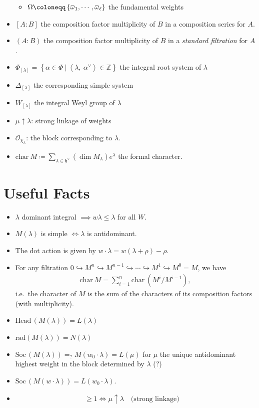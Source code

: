 \documentclass[11pt]{scrartcl}
\theoremstyle{definition}
\theoremstyle{theorem}
\theoremstyle{proof}
\theoremstyle{definition}
\theoremstyle{break}
\theoremstyle{problem}
\providecommand{\tightlist}{%
  \setlength{\itemsep}{0pt}\setlength{\parskip}{0pt}}
\DeclarePairedDelimiter\qty{(}{)}
\renewcommand{\qty}[1]{{\left(  {#1} \right)}}
\newcommand{\ZZ}[0]{{\mathbb{Z}}}
\newcommand{\ch}[0]{\mathrm{char}~}
\newcommand{\qtext}[1]{{\quad \text{#1} \quad}}
\newcommand{\definedas}[0]{\coloneqq}
\newcommand{\dual}[0]{^\vee}
\newcommand{\injects}[0]{\hookrightarrow}
\newcommand{\inner}[2]{{\left\langle {#1},~{#2} \right\rangle}}
\newcommand{\lieh}[0]{{\mathfrak{h}}}
\newcommand{\OO}[0]{{\mathcal{O}}}
\newcommand{\soc}[0]{\mathrm{Soc}\,}
\newcommand{\hd}[0]{\mathrm{Head}\,}
\newcommand{\rad}[0]{{\mathrm{rad}}}
\newcommand{\suchthat}[0]{{~\mathrel{\Big|}~}}
\newcommand{\theset}[1]{\left\{{#1}\right\}}
\renewcommand{\bar}[1]{\mkern 1.5mu\overline{\mkern-1.5mu#1\mkern-1.5mu}\mkern 1.5mu}
\begin{document}
\begin{itemize}
  \begin{itemize}
  \tightlist
  \item
    \(\Omega \definedas \theset{\bar \omega_1, \cdots, \bar \omega_\ell}\)
    the fundamental weights
  \end{itemize}
\item
  \([A: B]\) the composition factor multiplicity of \(B\) in a
  composition series for \(A\).
\item
  \((A: B)\) the composition factor multiplicity of \(B\) in a
  \emph{standard filtration} for \(A\).
\item
  \(\Phi_{[\lambda]} = \theset{\alpha\in \Phi \suchthat \inner{\lambda}{\alpha\dual} \in \ZZ}\)
  the integral root system of \(\lambda\)
\item
  \(\Delta_{[\lambda]}\) the corresponding simple system
\item
  \(W_{[\lambda]}\) the integral Weyl group of \(\lambda\)
\item
  \(\mu \uparrow \lambda\): strong linkage of weights
\item
  \(\OO_{\chi_\lambda}\): the block corresponding to \(\lambda\).
\item
  \(\ch M \definedas \sum_{\lambda \in \lieh\dual} \qty{\dim M_\lambda} e^{\lambda}\)
  the formal character.
\end{itemize}

\hypertarget{useful-facts}{%
\section{Useful Facts}\label{useful-facts}}

\begin{itemize}
\tightlist
\item
  \(\lambda\) dominant integral \(\implies w\lambda \leq \lambda\) for
  all \(W\).
\item
  \(M(\lambda)\) is simple \(\iff \lambda\) is antidominant.
\item
  The dot action is given by
  \(w\cdot \lambda = w(\lambda + \rho) - \rho\).
\item
  For any filtration
  \(0 \injects M^n \injects M^{n-1} \injects \cdots \injects M^1 \injects M^0 = M\),
  we have
  \begin{align*}\ch M = \sum_{i=1}^n \ch \qty{M^i/M^{i-1}},\end{align*}
  i.e.~the character of \(M\) is the sum of the characters of its
  composition factors (with multiplicity).
\item
  \(\hd(M(\lambda)) = L(\lambda)\)
\item
  \(\rad(M(\lambda)) = N(\lambda)\)
\item
  \(\soc(M(\lambda)) =_? M(w_0 \cdot \lambda) = L(\mu)\) for \(\mu\) the
  unique antidominant highest weight in the block determined by
  \(\lambda\) (?)
\item
  \(\soc(M(w \cdot \lambda)) = L(w_0 \cdot \lambda)\).
\item

  \begin{align*}[M(\lambda) : L(\mu)] \geq 1 \iff \mu \uparrow \lambda \qtext{(strong linkage)}\end{align*}
\end{itemize}
\end{document}
